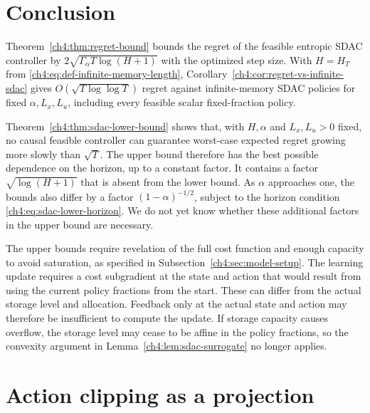 \section{Conclusion}
\label{ch4:sec:conclusion}

Theorem~\ref{ch4:thm:regret-bound} bounds the regret of the feasible entropic
SDAC controller by $2\sqrt{\Gamma_\alpha T\log(H+1)}$ with the optimized
step size. With $H=H_T$ from
\eqref{ch4:eq:def-infinite-memory-length},
Corollary~\ref{ch4:cor:regret-vs-infinite-sdac} gives
$O(\sqrt{T\log\log T})$ regret against infinite-memory SDAC policies
for fixed $\alpha,L_x,L_u$, including every feasible scalar fixed-fraction
policy.

Theorem~\ref{ch4:thm:sdac-lower-bound} shows that, with $H,\alpha$ and
$L_x,L_u>0$ fixed, no causal feasible controller can guarantee worst-case
expected regret growing more slowly than $\sqrt T$. The upper bound therefore
has the best possible dependence on the horizon, up to a constant factor.
It contains a factor $\sqrt{\log(H+1)}$ that is absent from the lower bound.
As $\alpha$ approaches one, the bounds also differ by a factor
$(1-\alpha)^{-1/2}$, subject to the horizon condition
\eqref{ch4:eq:sdac-lower-horizon}. We do not yet know whether these additional
factors in the upper bound are necessary.

The upper bounds require revelation of the full cost function and enough
capacity to avoid saturation, as specified in
Subsection~\ref{ch4:sec:model-setup}.
The learning update requires a cost subgradient at the state and action that
would result from using the current policy fractions from the start. These
can differ from the actual storage level and allocation. Feedback only at
the actual state and action may therefore be insufficient to compute the
update. If storage capacity causes overflow, the storage level may cease to
be affine in the policy fractions, so the convexity argument in
Lemma~\ref{ch4:lem:sdac-surrogate} no longer applies.

\section{Action clipping as a projection}
\label{ch4:subsec:scalar-entropy}

